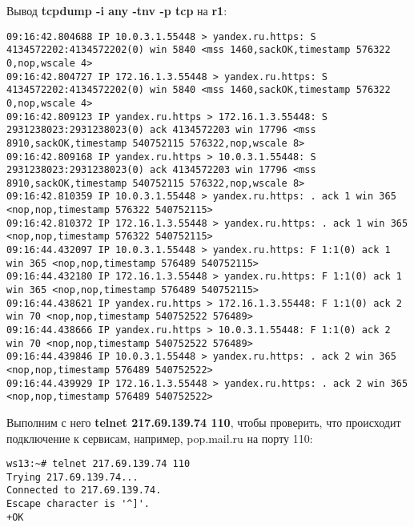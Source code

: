 \documentclass[a4paper,12pt]{article}
\begin{document}
Вывод \textbf{tcpdump -i any -tnv -p tcp} на \textbf{r1}:
\begin{Verbatim}
09:16:42.804688 IP 10.0.3.1.55448 > yandex.ru.https: S 4134572202:4134572202(0) win 5840 <mss 1460,sackOK,timestamp 576322 0,nop,wscale 4>
09:16:42.804727 IP 172.16.1.3.55448 > yandex.ru.https: S 4134572202:4134572202(0) win 5840 <mss 1460,sackOK,timestamp 576322 0,nop,wscale 4>
09:16:42.809123 IP yandex.ru.https > 172.16.1.3.55448: S 2931238023:2931238023(0) ack 4134572203 win 17796 <mss 8910,sackOK,timestamp 540752115 576322,nop,wscale 8>
09:16:42.809168 IP yandex.ru.https > 10.0.3.1.55448: S 2931238023:2931238023(0) ack 4134572203 win 17796 <mss 8910,sackOK,timestamp 540752115 576322,nop,wscale 8>
09:16:42.810359 IP 10.0.3.1.55448 > yandex.ru.https: . ack 1 win 365 <nop,nop,timestamp 576322 540752115>
09:16:42.810372 IP 172.16.1.3.55448 > yandex.ru.https: . ack 1 win 365 <nop,nop,timestamp 576322 540752115>
09:16:44.432097 IP 10.0.3.1.55448 > yandex.ru.https: F 1:1(0) ack 1 win 365 <nop,nop,timestamp 576489 540752115>
09:16:44.432180 IP 172.16.1.3.55448 > yandex.ru.https: F 1:1(0) ack 1 win 365 <nop,nop,timestamp 576489 540752115>
09:16:44.438621 IP yandex.ru.https > 172.16.1.3.55448: F 1:1(0) ack 2 win 70 <nop,nop,timestamp 540752522 576489>
09:16:44.438666 IP yandex.ru.https > 10.0.3.1.55448: F 1:1(0) ack 2 win 70 <nop,nop,timestamp 540752522 576489>
09:16:44.439846 IP 10.0.3.1.55448 > yandex.ru.https: . ack 2 win 365 <nop,nop,timestamp 576489 540752522>
09:16:44.439929 IP 172.16.1.3.55448 > yandex.ru.https: . ack 2 win 365 <nop,nop,timestamp 576489 540752522>
\end{Verbatim}

Выполним с него \textbf{telnet 217.69.139.74 110},  чтобы проверить, что
происходит подключение к сервисам, например, pop.mail.ru на порту 110:
\begin{Verbatim}
ws13:~# telnet 217.69.139.74 110
Trying 217.69.139.74...
Connected to 217.69.139.74.
Escape character is '^]'.
+OK
\end{Verbatim}
\end{document}
